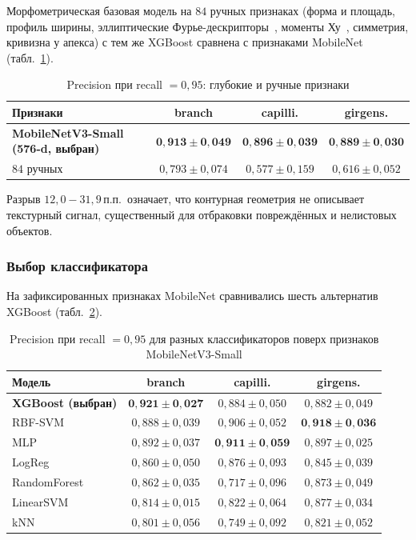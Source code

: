 Морфометрическая базовая модель на $84$ ручных признаках (форма и площадь,
профиль ширины, эллиптические Фурье-дескрипторы~\cite{KuhlGiardina1982},
моменты Ху~\cite{Hu1962Moments}, симметрия, кривизна у апекса) с тем же XGBoost
сравнена с признаками MobileNet
(табл.~\ref{tab:clf_features}).

\begin{table}[H]
\centering
\caption{Precision при recall $= 0{,}95$: глубокие и ручные признаки}
\label{tab:clf_features}
\small
\begin{tabular}{lccc}
\hline
\textbf{Признаки} & \textbf{branch} & \textbf{capilli.} & \textbf{girgens.} \\
\hline
\textbf{MobileNetV3-Small (576-d, выбран)} & $\mathbf{0{,}913 \pm 0{,}049}$ & $\mathbf{0{,}896 \pm 0{,}039}$ & $\mathbf{0{,}889 \pm 0{,}030}$ \\
$84$ ручных & $0{,}793 \pm 0{,}074$ & $0{,}577 \pm 0{,}159$ & $0{,}616 \pm 0{,}052$ \\
\hline
\end{tabular}
\end{table}

Разрыв $12{,}0\!-\!31{,}9$\,п.п.\ означает, что контурная геометрия не
описывает текстурный сигнал, существенный для отбраковки повреждённых и
нелистовых объектов.

\subsubsection*{Выбор классификатора}

На зафиксированных признаках MobileNet сравнивались шесть альтернатив XGBoost
(табл.~\ref{tab:clf_models}).

\begin{table}[H]
\centering
\caption{Precision при recall $= 0{,}95$ для разных классификаторов поверх
признаков MobileNetV3-Small}
\label{tab:clf_models}
\small
\begin{tabular}{lccc}
\hline
\textbf{Модель} & \textbf{branch} & \textbf{capilli.} & \textbf{girgens.} \\
\hline
\textbf{XGBoost (выбран)} & $\mathbf{0{,}921 \pm 0{,}027}$ & $0{,}884 \pm 0{,}050$ & $0{,}882 \pm 0{,}049$ \\
RBF-SVM       & $0{,}888 \pm 0{,}039$ & $0{,}906 \pm 0{,}052$ & $\mathbf{0{,}918 \pm 0{,}036}$ \\
MLP           & $0{,}892 \pm 0{,}037$ & $\mathbf{0{,}911 \pm 0{,}059}$ & $0{,}897 \pm 0{,}025$ \\
LogReg        & $0{,}860 \pm 0{,}050$ & $0{,}876 \pm 0{,}093$ & $0{,}845 \pm 0{,}039$ \\
RandomForest~\cite{Breiman2001RF}  & $0{,}862 \pm 0{,}035$ & $0{,}717 \pm 0{,}096$ & $0{,}873 \pm 0{,}049$ \\
LinearSVM     & $0{,}814 \pm 0{,}015$ & $0{,}822 \pm 0{,}064$ & $0{,}877 \pm 0{,}034$ \\
kNN           & $0{,}801 \pm 0{,}056$ & $0{,}749 \pm 0{,}092$ & $0{,}821 \pm 0{,}052$ \\
\hline
\end{tabular}
\end{table}

